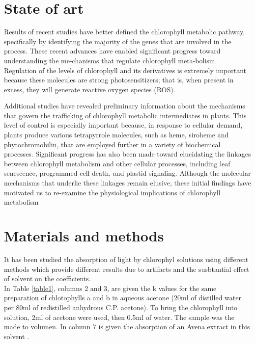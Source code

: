 \documentclass[a4paper, twocolumn, 11pt]{article}
\begin{document}
\section{State of art}
	Results of recent studies have better defined the chlorophyll metabolic pathway,\\ specifically by identifying the majority of the genes that are involved in the process. These recent advances have enabled significant progress toward understanding the me-chanisms that regulate chlorophyll meta-bolism. Regulation of the levels of chlorophyll and its derivatives is extremely important because these molecules are strong photosensitizers; that is, when present in excess, they will generate reactive oxygen species (ROS).
	
	Additional studies have revealed preliminary information about the mechanisms that govern the trafficking of chlorophyll metabolic intermediates in plants. This level of control is especially important because, in response to cellular demand, plants produce various tetrapyrrole molecules, such as heme, siroheme and phytochromobilin, that are employed further in a variety of biochemical processes. Significant progress has also been made toward elucidating the linkages between chlorophyll metabolism and other cellular processes, including leaf senescence, programmed cell death, and plastid signaling. Although the molecular mechanisms that underlie these linkages remain elusive, these initial findings have motivated us to re-examine the physiological implications of chlorophyll metabolism \cite{Tanaka2006}

\section{Materials and methods}
	It has been studied the absorption of light by chlorophyl solutions using different methods which provide different results due to artifacts and the susbtantial effect of solvent on the coefficients. \\
	
	In Table \ref{table1}, columns 2 and 3, are given the k values for the same preparation of chlotophylls a and b in aqueous acetone (20ml of distilled water per 80ml of redistilled anhydrous C.P. acetone). To bring the chlorophyll into solution, 2ml of acetone were used, then 0.5ml of water. The sample was the made to volumen. In column 7 is given the absorption of an Avena extract in this solvent \cite{Mackinney}.\\
	
\end{document}
